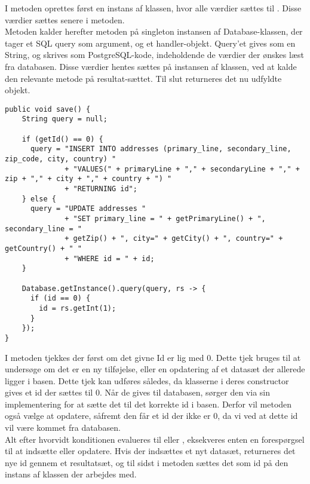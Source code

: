 \documentclass[../../main.tex]{subfiles}
\begin{document}
I metoden oprettes først en instans af klassen, hvor alle værdier sættes til . Disse værdier sættes senere i metoden. \\
Metoden kalder herefter metoden  på singleton instansen af Database-klassen, der tager et SQL query som argument, og et handler-objekt. Query'et gives som en String, og skrives som PostgreSQL-kode, indeholdende de værdier der ønskes læst fra databasen. 
Disse værdier hentes sættes på instansen af klassen, ved at kalde den relevante  metode på resultat-sættet. Til slut returneres det nu udfyldte objekt. 

\begin{lstlisting}[caption=DataAddress.save(),captionpos=b, label=DataAddress.save()]
public void save() {
    String query = null;

    if (getId() == 0) {
      query = "INSERT INTO addresses (primary_line, secondary_line, zip_code, city, country) "
              + "VALUES(" + primaryLine + "," + secondaryLine + "," + zip + "," + city + "," + country + ") "
              + "RETURNING id";
    } else {
      query = "UPDATE addresses "
              + "SET primary_line = " + getPrimaryLine() + ", secondary_line = "
              + getZip() + ", city=" + getCity() + ", country=" + getCountry() + " "
              + "WHERE id = " + id;
    }

    Database.getInstance().query(query, rs -> {
      if (id == 0) {
        id = rs.getInt(1);
      }
    });
}

\end{lstlisting}

I metoden tjekkes der først om det givne Id er lig med 0. Dette tjek bruges til at undersøge om det er en ny tilføjelse, eller en opdatering af et datasæt der allerede ligger i basen. Dette tjek kan udføres således, da klasserne i deres constructor gives et id der sættes til 0. Når de gives til databasen, sørger den via sin implementering for at sætte det til det korrekte id i basen. Derfor vil metoden også vælge at opdatere, såfremt den får et id der ikke er 0, da vi ved at dette id vil være kommet fra databasen. \\
Alt efter hvorvidt konditionen evalueres til  eller , eksekveres enten en forespørgsel til at indsætte eller opdatere. Hvis der indsættes et nyt datasæt, returneres det nye id gennem et resultatsæt, og til sidst i metoden sættes det som id på den instans af klassen der arbejdes med.
\end{document}
